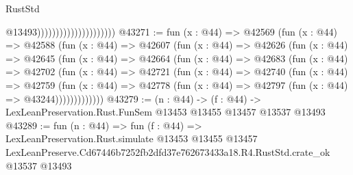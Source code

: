\begin{lexlean}{RustStd}
\begin{coremodule}
                                              @13493)))))))))))))))))))))
@43271 := fun (x : @44) =>
  @42569
    (fun (x : @44) =>
    @42588
      (fun (x : @44) =>
      @42607
        (fun (x : @44) =>
        @42626
          (fun (x : @44) =>
          @42645
            (fun (x : @44) =>
            @42664
              (fun (x : @44) =>
              @42683
                (fun (x : @44) =>
                @42702
                  (fun (x : @44) =>
                  @42721
                    (fun (x : @44) =>
                    @42740
                      (fun (x : @44) =>
                      @42759
                        (fun (x : @44) =>
                        @42778 (fun (x : @44) => @42797 (fun (x : @44) => @43244)))))))))))))
@43279 := (n : @44) ->
  (f : @44) -> LexLeanPreservation.Rust.FunSem @13453 @13455 @13457 @13537 @13493
@43289 := fun (n : @44) =>
  fun (f : @44) =>
  LexLeanPreservation.Rust.simulate
    @13453
    @13455
    @13457
    LexLeanPreserve.Cd67446b7252fb2dfd37e762673433a18.R4.RustStd.crate_ok
    @13537
    @13493
\end{coremodule}
\end{lexlean}
